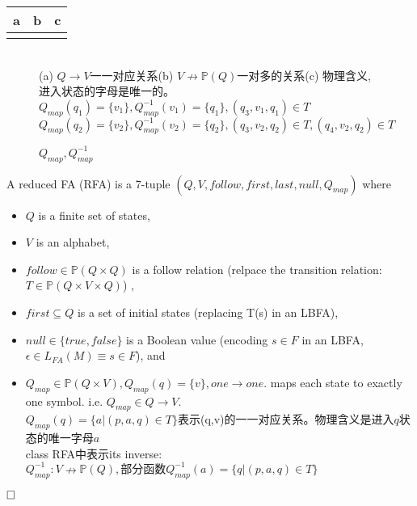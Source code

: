 \begin{tabular}{|c|c|c|}
	\hline
	a & b & c \\
	\hline
	\multicolumn{2}{|c|}{} &  \\
	\hline
\end{tabular}
\begin{figure}[htbp]
	\\
	(a) $Q\to V$一一对应关系\quad (b) $V \nrightarrow \mathbb{P}(Q)$一对多的关系\quad (c) 物理含义,进入状态的字母是唯一的。\\
	$Q_{map}(q_1)=\{v_1\},Q_{map}^{-1}(v_1)=\{q_1\},(q_3,v_1,q_1)\in T$\\
	$Q_{map}(q_2)=\{v_2\},Q_{map}^{-1}(v_2)=\{q_2\},(q_3,v_2,q_2)\in T,(q_4,v_2,q_2)\in T$
	
	\caption{$Q_{map},Q_{map}^{-1}$}
\end{figure}

\begin{definition}[RFA]
	A reduced FA (RFA) is a 7-tuple $(Q,V,follow,first,last,null,Q_{map})$ where
	\begin{itemize}
		\item $Q$ is a finite set of states,
		\item $V$ is an alphabet,
		\item $follow\in \mathbb{P}(Q\times Q)$ is a follow relation (relpace the transition relation:  $T\in \mathbb{P}(Q\times V\times Q)$) ,
		\item $first\subseteq Q$ is a set of initial states (replacing T(s) in an LBFA),
		\item $null\in \{true,false\}$ is a Boolean value (encoding $s\in F$ in an LBFA,$\epsilon\in L_{FA}(M)\equiv s\in F$), and
		\item $Q_{map}\in\mathbb{P}(Q\times V),Q_{map}(q)=\{v\},one\to one.$ maps
		each state to exactly one symbol. i.e. $Q_{map}\in Q\to V$.\\
		$Q_{map}(q) = \{a | (p,a,q) \in T\}$表示(q,v)的一一对应关系。物理含义是进入$q$状态的唯一字母$a$\\	
	    class RFA中表示its inverse: $Q_{map}^{-1}: V \nrightarrow \mathbb{P}(Q),\text{部分函数} Q_{map}^{-1}(a) = \{q|(p,a,q) \in T\}$\\
	\end{itemize}   $\hfill\square$
\end{definition}

